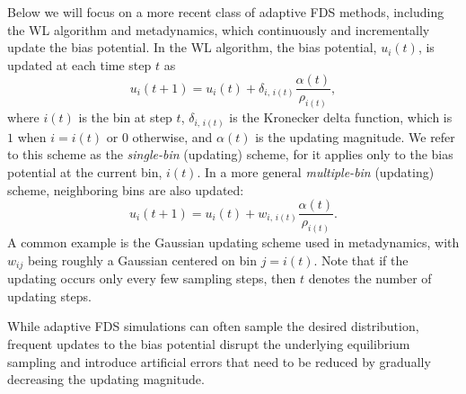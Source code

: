 \documentclass[reprint, superscriptaddress, floatfix]{revtex4-1}
\begin{document}
Below we will focus on a more recent class of adaptive FDS methods,
including the WL algorithm\cite{wang2001, wang2001pre}
and metadynamics\cite{huber1994, laio2002, *laio2008, *barducci2011, *sutto2012},
which
continuously and incrementally update the bias potential.
%
%
In the WL algorithm\cite{wang2001, wang2001pre},
the bias potential, $u_i(t)$, is updated
at each time step $t$ as
%
\begin{equation}
  u_i(t+1)
  =
  u_i(t)
  +
  \delta_{i, \, i(t)}
  \frac{ \alpha(t) } { \rho_{i(t)} }
  ,
\label{eq:wl_update}
\end{equation}
%
where $i(t)$ is the bin at step $t$,
$\delta_{i, \, i(t)}$ is the Kronecker delta function,
which is $1$ when $i = i(t)$ or $0$ otherwise,
and $\alpha(t)$ is the updating magnitude.
%
We refer to this scheme as
the \emph{single-bin} (updating) scheme,
for it applies only to the bias potential
at the current bin, $i(t)$.
%
In a more general
\emph{multiple-bin} (updating) scheme,
neighboring bins are also updated:
%
\begin{equation}
  u_i(t+1)
  =
  u_i(t)
  +
  w_{i, \, i(t)}
  \frac{ \alpha(t) }
       { \rho_{i(t)} }
  .
  \label{eq:mbin_update}
\end{equation}
%
A common example is the Gaussian updating scheme used in metadynamics,
with $w_{ij}$ being roughly a Gaussian centered on bin $j = i(t)$.
%
Note that if the updating occurs
only every few sampling steps,
then $t$ denotes the number of updating steps.




While adaptive FDS simulations
can often sample the desired distribution,
frequent updates to the bias potential
disrupt the underlying equilibrium sampling
and introduce artificial errors that need to be
reduced by gradually decreasing the updating magnitude\cite{
  belardinelli2007, *belardinelli2007jcp, *belardinelli2008, *belardinelli2016,
  zhou2005, morozov2007, zhou2008,
  laio2005, bussi2006, poulain2006, liang2007,
  crespo2010, *atchade2011, *fort2015}.
\end{document}
